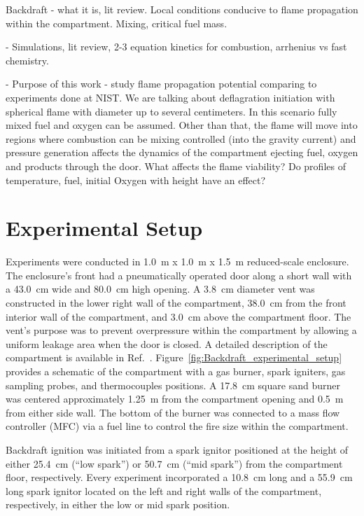 \documentclass[12pt,letterpaper]{article}
\begin{document}
\begin{flushleft}
Backdraft - what it is, lit review. Local conditions conducive to flame propagation within the compartment. Mixing, critical fuel mass.

- Simulations, lit review, 2-3 equation kinetics for combustion, arrhenius vs fast chemistry.

- Purpose of this work - study flame propagation potential comparing to experiments done at NIST. We are talking about deflagration initiation with spherical flame with diameter up to several centimeters. In this scenario fully mixed fuel and oxygen can be assumed. Other than that, the flame will move into regions where combustion can be mixing controlled (into the gravity current) and pressure generation affects the dynamics of the compartment ejecting fuel, oxygen and products through the door. What affects the flame viability? Do profiles of temperature, fuel, initial Oxygen with height have an effect? 

\section{Experimental Setup} \addvspace{10pt}
\label{sec:expsetup}
Experiments were conducted in 1.0~m x 1.0~m x 1.5~m reduced-scale enclosure. The enclosure’s front had a pneumatically operated door along a short wall with a 43.0~cm wide and 80.0~cm high opening. A 3.8~cm diameter vent was constructed in the lower right wall of the compartment, 38.0~cm from the front interior wall of the compartment, and 3.0~cm above the compartment floor. The vent's purpose was to prevent overpressure within the compartment by allowing a uniform leakage area when the door is closed. A detailed description of the compartment is available in Ref.~\cite{Brown2022}.
Figure~\ref{fig:Backdraft_experimental_setup} provides a schematic of the compartment with a gas burner, spark igniters, gas sampling probes, and thermocouples positions. A 17.8~cm square sand burner was centered approximately 1.25~m from the compartment opening and 0.5~m from either side wall. The bottom of the burner was connected to a mass flow controller (MFC) via a fuel line to control the fire size within the compartment. 

Backdraft ignition was initiated from a spark ignitor positioned at the height of either 25.4~cm (``low spark'') or 50.7~cm (``mid spark'') from the compartment floor, respectively. Every experiment incorporated a 10.8~cm long and a 55.9~cm long spark ignitor located on the left and right walls of the compartment, respectively, in either the low or mid spark position. 


\end{flushleft}
\end{document}
